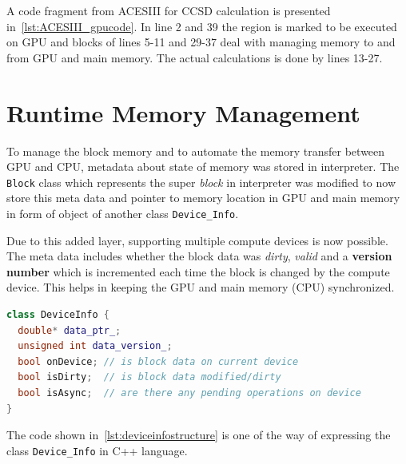 A code fragment from ACESIII for CCSD calculation is presented
in~\ref{lst:ACESIII_gpucode}. In line 2 and 39 the region is marked to be executed
on GPU and blocks of lines 5-11 and 29-37 deal with managing memory to and from
GPU and main memory. The actual calculations is done by lines 13-27.

\section{Runtime Memory Management}
To manage the block memory and to automate the memory transfer between GPU and CPU,
metadata about state of memory was stored in interpreter. The \texttt{Block} class
which represents the super \textit{block} in interpreter was modified to now store
this meta data and pointer to memory location in GPU and main memory in form of
object of another class \texttt{Device\_Info}.

Due to this added layer, supporting multiple compute devices is now possible.
The meta data includes whether the block data was \textit{dirty}, \textit{valid}
and a \textbf{version number} which is incremented each time the block is changed
by the compute device. This helps in keeping the GPU and main memory (CPU)
synchronized.

\begin{lstlisting}[caption={\texttt{Device\_Info} Class structure},
  language=C++,
  label={lst:deviceinfostructure}]
class DeviceInfo {
  double* data_ptr_;
  unsigned int data_version_;
  bool onDevice; // is block data on current device
  bool isDirty;  // is block data modified/dirty
  bool isAsync;  // are there any pending operations on device
}
\end{lstlisting}

The code shown in~\ref{lst:deviceinfostructure} is one of the way of expressing
the class \texttt{Device\_Info} in C++ language.

